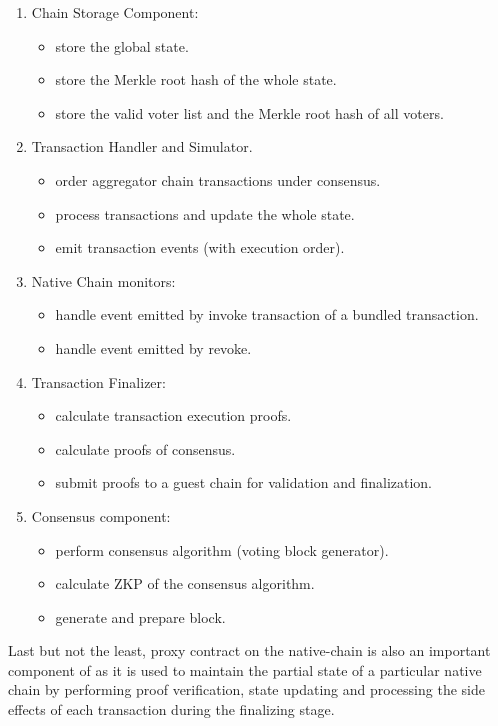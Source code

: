 \begin{enumerate}[leftmargin=*]
\item Chain Storage Component:
    \begin{itemize}
    \item store the global state.
    \item store the Merkle root hash of the whole state.
    \item store the valid voter list and the Merkle root hash of all voters.
    \end{itemize}
\item Transaction Handler and Simulator.
    \begin{itemize}
    \item order aggregator chain transactions under consensus.
    \item process transactions and update the whole state.
    \item emit transaction events (with execution order).
    \end{itemize}
\item Native Chain monitors:
    \begin{itemize}
    \item handle event emitted by invoke transaction of a bundled transaction.
    \item handle event emitted by revoke.
    \end{itemize}
\item Transaction Finalizer:
    \begin{itemize}
    \item calculate transaction execution proofs.
    \item calculate proofs of consensus.
    \item submit proofs to a guest chain for validation and finalization.
    \end{itemize}
\item Consensus component:
    \begin{itemize}
    \item perform consensus algorithm (voting block generator).
    \item calculate ZKP of the consensus algorithm.
    \item generate and prepare block.
    \end{itemize}
\end{enumerate}

Last but not the least, proxy contract on the native-chain is also an important component of \dprotocol as it is used to maintain the partial state of a particular native chain by performing proof verification, state updating and processing the side effects of each transaction during the finalizing stage.  

